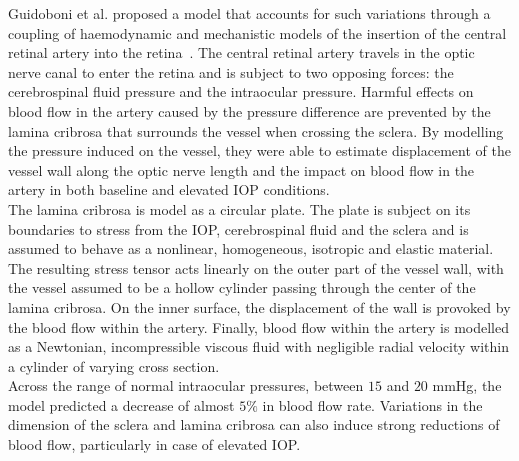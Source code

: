 \documentclass[12pt,a4paper]{journal}
\begin{document}
Guidoboni et al. proposed a model that accounts for such variations through a coupling of haemodynamic and mechanistic models of the insertion of the central retinal artery into the retina~\cite{Guidoboni_2014}.
The central retinal artery travels in the optic nerve canal to enter the retina and is subject to two opposing forces: the cerebrospinal fluid pressure and the intraocular pressure.
Harmful effects on blood flow in the artery caused by the pressure difference are prevented by the lamina cribrosa that surrounds the vessel when crossing the sclera.
By modelling the pressure induced on the vessel, they were able to estimate displacement of the vessel wall along the optic nerve length and the impact on blood flow in the artery in both baseline and elevated IOP conditions.\\
The lamina cribrosa is model as a circular plate.
The plate is subject on its boundaries to stress from the IOP, cerebrospinal fluid and the sclera and is assumed to behave as a nonlinear, homogeneous, isotropic and elastic material.
The resulting stress tensor acts linearly on the outer part of the vessel wall, with the vessel assumed to be a hollow cylinder passing through the center of the lamina cribrosa.
On the inner surface, the displacement of the wall is provoked by the blood flow within the artery.
Finally, blood flow within the artery is modelled as a Newtonian, incompressible viscous fluid with negligible radial velocity within a cylinder of varying cross section.\\
Across the range of normal intraocular pressures, between $15$ and $20$ mmHg, the model predicted a decrease of almost $5\%$ in blood flow rate.
Variations in the dimension of the sclera and lamina cribrosa can also induce strong reductions of blood flow, particularly in case of elevated IOP. \\
\end{document}
